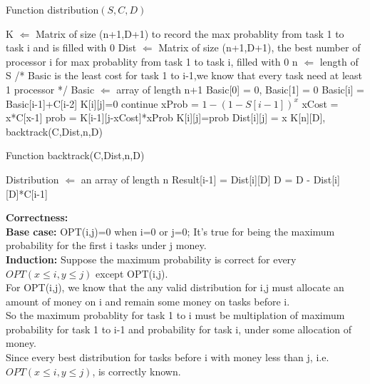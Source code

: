 \documentclass{article}
\begin{document}
\begin{algorithm}[H]
  \caption{Function distribution$(S,C,D)$}
  \label{alg1}
  \begin{algorithmic}
  \STATE K $\Longleftarrow$ Matrix of size (n+1,D+1) to record the max probablity from task 1 to task i and is filled with 0 
  \STATE Dist $\Longleftarrow$ Matrix of size (n+1,D+1), the best number of processor i for max probablity from task 1 to task i, filled with 0
  \STATE n $\Longleftarrow$ length of S
  \STATE/* Basic is the least cost for task 1 to i-1,we know that every task need at least 1 processor */
  \STATE Basic $\Longleftarrow$ array of length n+1
  \STATE Basic[0] = 0, Basic[1] = 0
  \STATE Basic[i] = Basic[i-1]+C[i-2]
  \ENDFOR
  \STATE K[i][j]=0
  \STATE continue
  \ENDIF
  \STATE xProb = $1-(1-S[i-1])^x$
  \STATE xCost = x*C[x-1]
  \STATE prob = K[i-1][j-xCost]*xProb
  \STATE K[i][j]=prob
  \STATE Dist[i][j] = x
  \ENDIF
  \ENDFOR
  \ENDFOR
  \ENDFOR
  \RETURN K[n][D], backtrack(C,Dist,n,D)
  \end{algorithmic}
\end{algorithm}
\begin{algorithm}[H]
  \caption{Function backtrack(C,Dist,n,D)}
  \label{alg1}
  \begin{algorithmic}
  \STATE Distribution $\Longleftarrow$ an array of length n
  \STATE Result[i-1] = Dist[i][D]
  \STATE D = D - Dist[i][D]*C[i-1]
  \ENDFOR
  \end{algorithmic}
\end{algorithm}
\noindent\textbf{\large Correctness:\\}
\textbf{Base case:} OPT(i,j)=0 when i=0 or j=0; It's true for being the maximum probability for the first i tasks under j money.\\
\textbf{Induction:} Suppose the maximum probability is correct for every $OPT(x\le i,y\le j)$ except OPT(i,j).\\
For OPT(i,j), we know that the any valid distribution for i,j must allocate an amount of money on i and remain some money on tasks before i.\\
So the maximum probablity for task 1 to i must be multiplation of maximum probability for task 1 to i-1 and probability for task i, under some allocation of money.\\
Since every best distribution for tasks before i with money less than j, i.e. $OPT(x\le i,y\le j)$, is correctly known.\\
\end{document}
